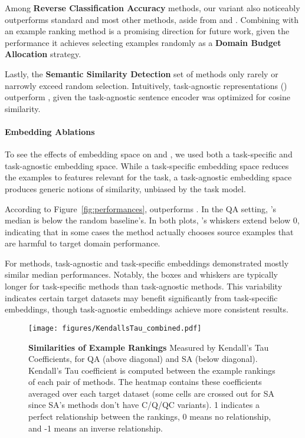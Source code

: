     Among \textbf{Reverse Classification Accuracy} methods, our \textbf{\rcas{}} variant also noticeably outperforms standard \rca{} and most other methods, aside from \dal{} and \bald{}.
    Combining \rcas{} with an example ranking method is a promising direction for future work, given the performance it achieves selecting examples randomly as a \textbf{Domain Budget Allocation} strategy.
    
    Lastly, the \textbf{Semantic Similarity Detection} set of methods only rarely or narrowly exceed random selection.
    Intuitively, task-agnostic representations (\knn{}) outperform \knns{}, given the task-agnostic sentence encoder was optimized for cosine similarity.
    
    \respace
    \paragraph{Embedding Ablations}
    To see the effects of embedding space on \knn{} and \dal{}, we used both a task-specific and task-agnostic embedding space. 
    While a task-specific embedding space reduces the examples to features relevant for the task, a task-agnostic embedding space produces generic notions of similarity, unbiased by the task model.
    
    According to Figure~\ref{fig:performances}, \knn{} outperforms \knns{}. 
    In the QA setting, \knns{}'s median is below the random baseline's. 
    In both plots, \knns{}'s whiskers extend below 0, indicating that in some cases the method actually chooses source examples that are harmful to target domain performance. 
    
    For \dal{} methods, task-agnostic and task-specific embeddings demonstrated mostly similar median performances. 
    Notably, the boxes and whiskers are typically longer for task-specific methods than task-agnostic methods.
    This variability indicates certain target datasets may benefit significantly from task-specific embeddings, though task-agnostic embeddings achieve more consistent results.
 
 \begin{figure*}[t]
    \centering
    \texttt{[image: figures/KendallsTau\_combined.pdf]}
    \caption{\label{fig:kendall-tau-heatmap} \textbf{Similarities of Example Rankings} Measured by Kendall's Tau Coefficients, for QA (above diagonal) and SA (below diagonal). 
    Kendall's Tau coefficient is computed between the example rankings of each pair of methods. 
    The heatmap contains these coefficients averaged over each target dataset (some cells are crossed out for SA since SA's \knn{} methods don't have C/Q/QC variants). 
    1 indicates a perfect relationship between the rankings, 0 means no relationship, and -1 means an inverse relationship.}
    \respace
    \respace
\end{figure*}
    
